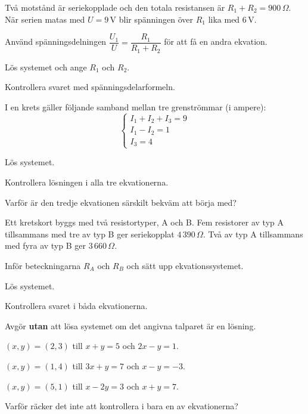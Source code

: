 Två motstånd är seriekopplade och den totala resistansen är $R_1 + R_2 = 900\,\Omega$. När serien
matas med $U = 9\,\text{V}$ blir spänningen över $R_1$ lika med $6\,\text{V}$.
\begin{parts}
  \item Använd spänningsdelningen $\dfrac{U_1}{U} = \dfrac{R_1}{R_1 + R_2}$ för att få en andra
    ekvation.
  \item Lös systemet och ange $R_1$ och $R_2$.
  \item Kontrollera svaret med spänningsdelarformeln.
\end{parts}

I en krets gäller följande samband mellan tre grenströmmar (i ampere):
\[
  \begin{cases}
    I_1 + I_2 + I_3 = 9 \\
    I_1 - I_2 = 1 \\
    I_3 = 4
  \end{cases}
\]
\begin{parts}
  \item Lös systemet.
  \item Kontrollera lösningen i alla tre ekvationerna.
  \item Varför är den tredje ekvationen särskilt bekväm att börja med?
\end{parts}

Ett kretskort byggs med två resistortyper, A och B. Fem resistorer av typ A tillsammans med tre av
typ B ger seriekopplat $4\,390\,\Omega$. Två av typ A tillsammans med fyra av typ B ger
$3\,660\,\Omega$.
\begin{parts}
  \item Inför beteckningarna $R_A$ och $R_B$ och sätt upp ekvationssystemet.
  \item Lös systemet.
  \item Kontrollera svaret i båda ekvationerna.
\end{parts}

Avgör \textbf{utan} att lösa systemet om det angivna talparet är en lösning.
\begin{parts}
  \item $(x, y) = (2, 3)$ till $x + y = 5$ och $2x - y = 1$.
  \item $(x, y) = (1, 4)$ till $3x + y = 7$ och $x - y = -3$.
  \item $(x, y) = (5, 1)$ till $x - 2y = 3$ och $x + y = 7$.
  \item Varför räcker det inte att kontrollera i bara en av ekvationerna?
\end{parts}

